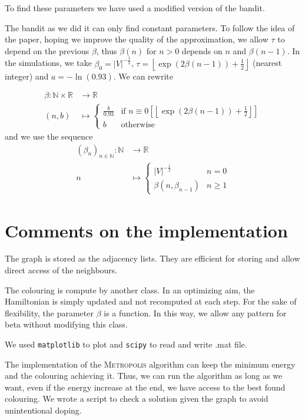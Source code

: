 \documentclass[a4paper, 11pt]{article}
\newcommand{\RR}{\mathbb{R}}
\newcommand{\NN}{\mathbb{N}}
\newcommand{\floor}[1]{{\left\lfloor #1 \right\rfloor}}
\begin{document}
To find these parameters we have used a modified version of the bandit. 

The bandit as we did it can only find constant parameters. To follow the idea of the paper, hoping we improve the quality of the approximation, we allow $\tau$ to depend on the previous $\beta$, thus $\beta(n)$ for $n>0$ depends on $n$ and $\beta(n-1)$. In the simulations, we take $\beta_0 = {\lvert V\rvert}^{-\frac{1}{2}}$, $\tau = \floor{\exp(2\beta(n-1))+\frac{1}{2}}$ (nearest integer) and $a = -\ln(0.93)$. We can rewrite

\[
    \begin{aligned}
        \beta : \NN\times\RR &\to \RR\\
        (n, b) &\mapsto
            \begin{cases}
                \frac{b}{0.93} & \text{if } n \equiv 0\left[\floor{\exp(2\beta(n-1))+\frac{1}{2}}\right] \\
                b & \text{otherwise}
            \end{cases}
    \end{aligned}
\]
and we use the sequence
\[
    \begin{aligned}
        \left(\beta_n\right)_{n\in\NN} : \NN &\to \RR\\
        n &\mapsto
            \begin{cases}
                {\lvert V\rvert}^{-\frac{1}{2}} & n = 0 \\
                \beta(n, \beta_{n-1}) & n \geqslant 1
            \end{cases}
    \end{aligned}
\]

\section{Comments on the implementation}

The graph is stored as the adjacency lists. They are efficient for storing and allow direct access of the neighbours.

The colouring is compute by another class. In an optimizing aim, the Hamiltonian is simply updated and not recomputed at each step. For the sake of flexibility, the parameter $\beta$ is a function. In this way, we allow any pattern for beta without modifying this class.

We used \texttt{matplotlib} to plot and \texttt{scipy} to read and write .mat file.

The implementation of the \textsc{Metropolis} algorithm can keep the minimum energy and the colouring achieving it. Thus, we can run the algorithm as long as we want, even if the energy increase at the end, we have access to the best found colouring. We wrote a script to check a solution given the graph to avoid unintentional doping.
\end{document}
